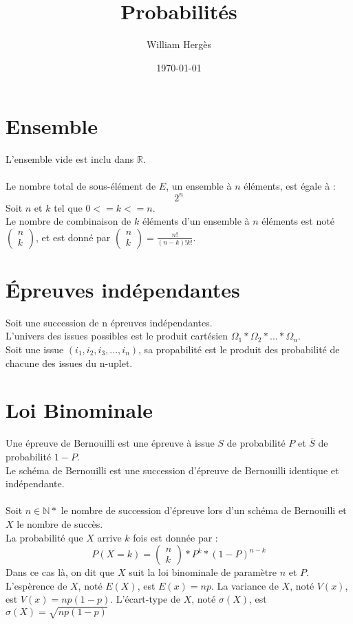 \documentclass{article}
\title{Probabilités}
\author{William Hergès}
\date{\today}
\begin{document}
	\maketitle

	\section{Ensemble}

	L'ensemble vide est inclu dans $\mathbb{R}$. \\
	\\
	Le nombre total de sous-élément de $E$, un ensemble à $n$ éléments, est égale à :
	\[ 2^n\]
	Soit $n$ et $k$ tel que $0 <= k <= n$. \\
	Le nombre de combinaison de $k$ éléments d'un ensemble à $n$ éléments est noté $ 
		\begin{pmatrix}
                	n \\
                        k
		\end{pmatrix}
	$, et est donné par $
		\begin{pmatrix}
                	n \\
                        k
		\end{pmatrix} = \frac{n!}{(n-k)!k!}
	$.

	\section{Épreuves indépendantes}

	Soit une succession de n épreuves indépendantes. \\
	L'univers des issues possibles est le produit cartésien $\Omega_1 * \Omega_2 * ... * \Omega_n$. \\
	Soit une issue $(i_1,i_2,i_3,...,i_n)$, sa propabilité est le produit des probabilité de chacune des issues du n-uplet.

	\section{Loi Binominale}

	Une épreuve de Bernouilli est une épreuve à issue $S$ de probabilité $P$ et $\overline{S}$ de probabilité $1-P$. \\
	Le schéma de Bernouilli est une succession d'épreuve de Bernouilli identique et indépendante. \\
	\\
	Soit $n\in\mathbb{N*}$ le nombre de succession d'épreuve lors d'un schéma de Bernouilli et $X$ le nombre de succès. \\
	La probabilité que $X$ arrive $k$ fois est donnée par :
	\[ P(X = k) = \begin{pmatrix}n \\ k\end{pmatrix}*P^k*(1-P)^{n-k} \]
	Dans ce cas là, on dit que $X$ suit la loi binominale de paramètre $n$ et $P$. \\
	L'espèrence de $X$, noté $E(X)$, est $E(x) = np$. La variance de $X$, noté $V(x)$, est $V(x) = np(1-p)$. L'écart-type de $X$, noté $\sigma(X)$, est $\sigma(X) = \sqrt{np(1-p)}$
\end{document}

